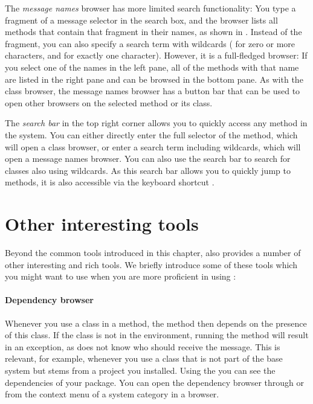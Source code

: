 \documentclass[a4paper,10pt,twoside]{book}
\begin{document}
The \emph{message names} browser has more limited search functionality:
You type a fragment of a message selector in the search box, and the browser lists all methods that contain that fragment in their names, as shown in .
Instead of the fragment, you can also specify a search term with wildcards (\ct{*} for zero or more characters, and \ct{#} for exactly one character).
However, it is a full-fledged browser:
If you select one of the names in the left pane, all of the methods with that name are listed in the right pane and can be browsed in the bottom pane.
As with the class browser, the message names browser has a button bar that can be used to open other  browsers on the selected method or its class.

The \emph{search bar} in the top right corner allows you to quickly access any method in the system.
You can either directly enter the full selector of the method, which will open a class browser, or enter a search term including wildcards, which will open a message names browser.
You can also use the search bar to search for classes also using wildcards.
As this search bar allows you to quickly jump to methods, it is also accessible via the keyboard shortcut .



\section{Other interesting tools}
Beyond the common tools introduced in this chapter, \sq also provides a number of other interesting and rich tools.
We briefly introduce some of these tools which you might want to use when you are more proficient in using \sq:

\paragraph{Dependency browser}
Whenever you use a class in a method, the method then depends on the presence of this class.
If the class is not in the environment, running the method will result in an exception, as \sq does not know who should receive the message.
This is relevant, for example, whenever you use a class that is not part of the base system but stems from a project you installed.
Using the  you can see the dependencies of your package.
You can open the dependency browser through  or from the context menu of a system category in a browser.
\end{document}
